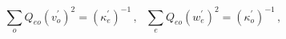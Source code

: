 \begin{equation}
\sum_{o}Q_{eo}(v_{o}^{\prime })^{2}=(\kappa _{e}^{\prime
})^{-1}\,,
~~~\sum_{e}Q_{eo}(w_{e}^{\prime })^{2}=(\kappa _{o}^{\prime })^{-1}\,,
\label{eq:eqvw}
\end{equation}

